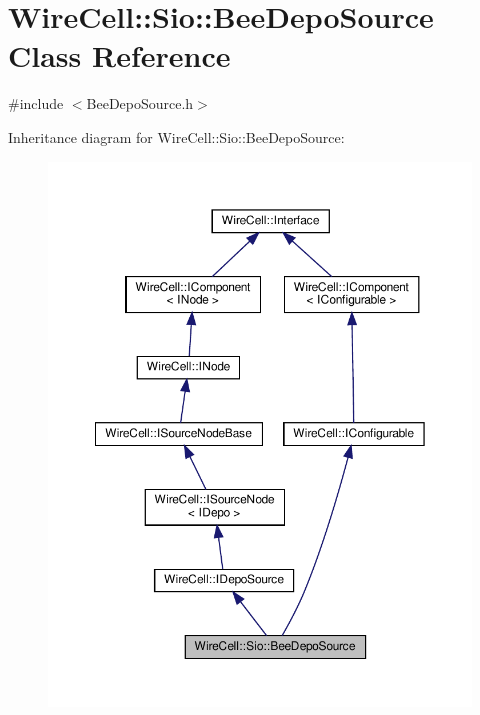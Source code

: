 \hypertarget{class_wire_cell_1_1_sio_1_1_bee_depo_source}{}\section{Wire\+Cell\+:\+:Sio\+:\+:Bee\+Depo\+Source Class Reference}
\label{class_wire_cell_1_1_sio_1_1_bee_depo_source}


{\ttfamily \#include $<$Bee\+Depo\+Source.\+h$>$}



Inheritance diagram for Wire\+Cell\+:\+:Sio\+:\+:Bee\+Depo\+Source\+:
\nopagebreak
\begin{figure}[H]
\begin{center}
\leavevmode
\includegraphics[width=350pt]{class_wire_cell_1_1_sio_1_1_bee_depo_source__inherit__graph}
\end{center}
\end{figure}


